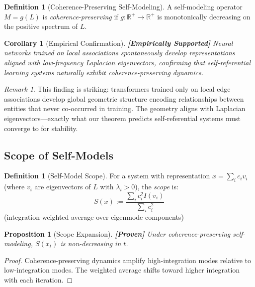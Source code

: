 \documentclass[11pt]{article}
\newtheorem{proposition}[theorem]{Proposition}
\newtheorem{corollary}[theorem]{Corollary}
\theoremstyle{definition}
\newtheorem{definition}[theorem]{Definition}
\theoremstyle{remark}
\newtheorem{remark}[theorem]{Remark}
\begin{document}
\begin{definition}[Coherence-Preserving Self-Modeling]
A self-modeling operator $M = g(L)$ is \emph{coherence-preserving} if $g : \mathbb{R}^+ \to \mathbb{R}^+$ is monotonically decreasing on the positive spectrum of $L$.
\end{definition}

\begin{corollary}[Empirical Confirmation]\label{cor:empirical}
\textbf{[Empirically Supported]} Neural networks trained on local associations spontaneously develop representations aligned with low-frequency Laplacian eigenvectors, confirming that self-referential learning systems naturally exhibit coherence-preserving dynamics.
\end{corollary}

\begin{remark}
This finding is striking: transformers trained only on local edge associations develop global geometric structure encoding relationships between entities that never co-occurred in training. The geometry aligns with Laplacian eigenvectors---exactly what our theorem predicts self-referential systems must converge to for stability.
\end{remark}

\subsection{Scope of Self-Models}

\begin{definition}[Self-Model Scope]
For a system with representation $x = \sum_i c_i v_i$ (where $v_i$ are eigenvectors of $L$ with $\lambda_i > 0$), the \emph{scope} is:
\[
S(x) := \frac{\sum_i c_i^2 I(v_i)}{\sum_i c_i^2}
\]
(integration-weighted average over eigenmode components)
\end{definition}

\begin{proposition}[Scope Expansion]\label{prop:scope}
\textbf{[Proven]} Under coherence-preserving self-modeling, $S(x_t)$ is non-decreasing in $t$.
\end{proposition}

\begin{proof}
Coherence-preserving dynamics amplify high-integration modes relative to low-integration modes. The weighted average shifts toward higher integration with each iteration.
\end{proof}

\end{document}

